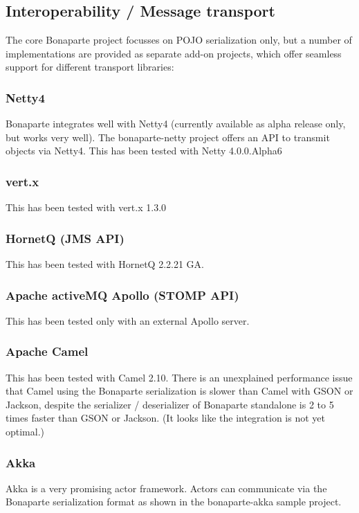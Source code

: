 \documentclass[11pt,a4paper,oneside]{article}
\begin{document}
\subsection{Interoperability / Message transport}
The core Bonaparte project focusses on POJO serialization only, but a number of implementations are provided as separate add-on projects, which offer seamless support for different transport libraries:

\subsubsection{Netty4}
Bonaparte integrates well with Netty4 (currently available as alpha release only, but works very well).
The bonaparte-netty project offers an API to transmit objects via Netty4.
This has been tested with Netty 4.0.0.Alpha6

\subsubsection{vert.x}
This has been tested with vert.x 1.3.0

\subsubsection{HornetQ (JMS API)}
This has been tested with HornetQ 2.2.21 GA.

\subsubsection{Apache activeMQ Apollo (STOMP API)}
This has been tested only with an external Apollo server.

\subsubsection{Apache Camel}
This has been tested with Camel 2.10. There is an unexplained performance issue that Camel using the Bonaparte serialization is slower than Camel with GSON or Jackson,
 despite the serializer / deserializer of Bonaparte standalone is 2 to 5 times faster than GSON or Jackson. (It looks like the integration is not yet optimal.)

\subsubsection{Akka}
Akka is a very promising actor framework. Actors can communicate via the Bonaparte serialization format as shown in the bonaparte-akka sample project.
\end{document}
